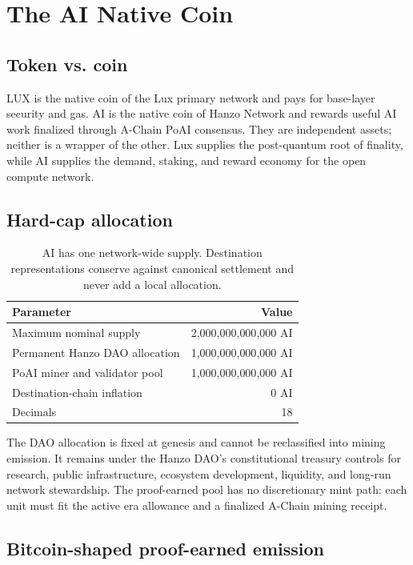 \section{The AI Native Coin}
\label{sec:aicoin}

\subsection{Token vs. coin}

LUX is the native coin of the Lux primary network and pays for base-layer
security and gas. AI is the native coin of Hanzo Network and rewards useful AI
work finalized through A-Chain PoAI consensus. They are independent assets;
neither is a wrapper of the other. Lux supplies the post-quantum root of
finality, while AI supplies the demand, staking, and reward economy for the
open compute network.

\subsection{Hard-cap allocation}

\begin{table}[h]
\centering
\small
\begin{tabular}{lr}
\toprule
\textbf{Parameter} & \textbf{Value} \\
\midrule
Maximum nominal supply & 2{,}000{,}000{,}000{,}000 AI \\
Permanent Hanzo DAO allocation & 1{,}000{,}000{,}000{,}000 AI \\
PoAI miner and validator pool & 1{,}000{,}000{,}000{,}000 AI \\
Destination-chain inflation & 0 AI \\
Decimals & 18 \\
\bottomrule
\end{tabular}
\caption{AI has one network-wide supply. Destination representations conserve
against canonical settlement and never add a local allocation.}
\label{tab:supply}
\end{table}

The DAO allocation is fixed at genesis and cannot be reclassified into mining
emission. It remains under the Hanzo DAO's constitutional treasury controls for
research, public infrastructure, ecosystem development, liquidity, and long-run
network stewardship. The proof-earned pool has no discretionary mint path: each
unit must fit the active era allowance and a finalized A-Chain mining receipt.

\subsection{Bitcoin-shaped proof-earned emission}

